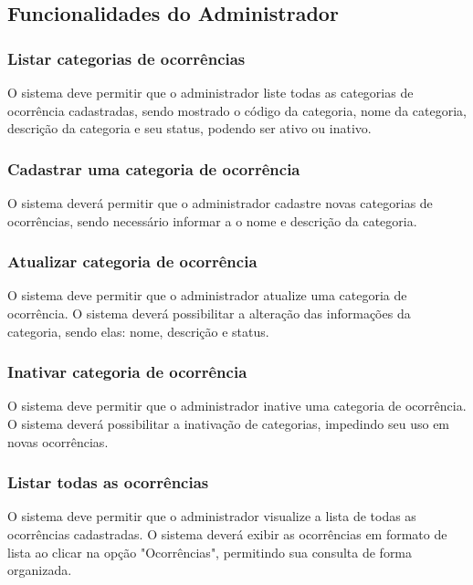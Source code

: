 \subsection{Funcionalidades do Administrador}


\subsubsection{Listar categorias de ocorrências}

O sistema deve permitir que o administrador liste todas as categorias de ocorrência cadastradas, sendo mostrado o código da categoria, nome da categoria, descrição da categoria e seu status, podendo ser ativo ou inativo.

\subsubsection{Cadastrar uma categoria de ocorrência}

O sistema deverá permitir que o administrador cadastre novas categorias de ocorrências, sendo necessário informar a o nome e descrição da categoria.

\subsubsection{Atualizar categoria de ocorrência}

O sistema deve permitir que o administrador atualize uma categoria de ocorrência. O sistema deverá possibilitar a alteração das informações da categoria, sendo elas: nome, descrição e status.

\subsubsection{Inativar categoria de ocorrência}

O sistema deve permitir que o administrador inative uma categoria de ocorrência. O sistema deverá possibilitar a inativação de categorias, impedindo seu uso em novas ocorrências.

\subsubsection{Listar todas as ocorrências}

O sistema deve permitir que o administrador visualize a lista de todas as ocorrências cadastradas. O sistema deverá exibir as ocorrências em formato de lista ao clicar na opção "Ocorrências", permitindo sua consulta de forma organizada.

